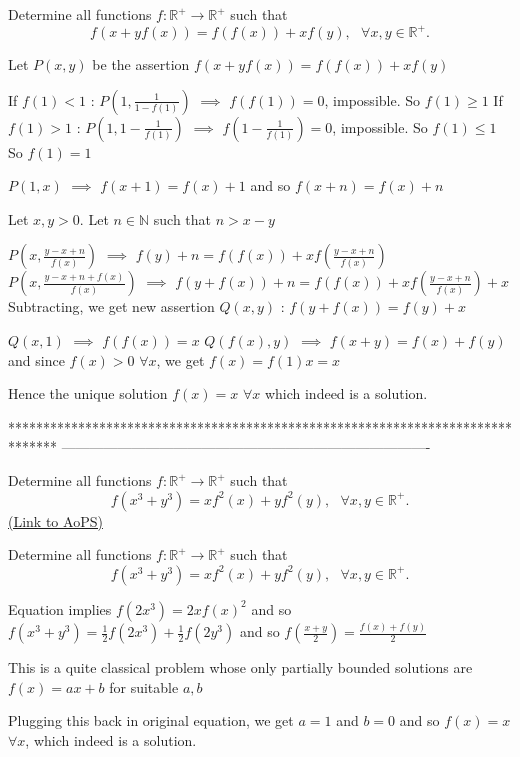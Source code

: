 \begin{solution}
	\begin{tcolorbox}Determine all functions $f : \mathbb{R}^+ \to \mathbb{R}^+$ such that \[   f(x+yf(x))=f(f(x))+xf(y)   , \ \ \  \forall x,y \in \mathbb{R}^+.\]\end{tcolorbox}
Let $P(x,y)$ be the assertion $f(x+yf(x))=f(f(x))+xf(y)$

If $f(1)<1$ : $P(1,\frac 1{1-f(1)})$ $\implies$ $f(f(1))=0$, impossible. So $f(1)\ge 1$
If $f(1)>1$ : $P(1,1-\frac 1{f(1)})$ $\implies$ $f(1-\frac 1{f(1)})=0$, impossible. So $f(1)\le 1$
So $f(1)=1$

$P(1,x)$ $\implies$ $f(x+1)=f(x)+1$ and so $f(x+n)=f(x)+n$

Let $x,y>0$. Let $n\in\mathbb N$ such that $n>x-y$

$P(x,\frac{y-x+n}{f(x)})$ $\implies$  $f(y)+n=f(f(x))+xf(\frac{y-x+n}{f(x)})$
$P(x,\frac{y-x+n+f(x)}{f(x)})$ $\implies$ $f(y+f(x))+n=f(f(x))+xf(\frac{y-x+n}{f(x)})+x$
Subtracting, we get new assertion $Q(x,y)$ : $f(y+f(x))=f(y)+x$

$Q(x,1)$ $\implies$ $f(f(x))=x$
$Q(f(x),y)$ $\implies$ $f(x+y)=f(x)+f(y)$ and since $f(x)>0$ $\forall x$, we get $f(x)=f(1)x=x$

Hence the unique solution $\boxed{f(x)=x}$ $\forall x$ which indeed is a solution.
\end{solution}
*******************************************************************************
-------------------------------------------------------------------------------

\begin{problem}
	Determine all functions $f : \mathbb{R}^+ \to \mathbb{R}^+$ such that \[ f(x^{3}+y^{3})=xf^{2}(x)+yf^{2}(y) , \ \ \  \forall x,y \in \mathbb{R}^+.\]
	\flushright \href{https://artofproblemsolving.com/community/c6h616142}{(Link to AoPS)}
\end{problem}



\begin{solution}
	\begin{tcolorbox}Determine all functions $f : \mathbb{R}^+ \to \mathbb{R}^+$ such that \[ f(x^{3}+y^{3})=xf^{2}(x)+yf^{2}(y) , \ \ \  \forall x,y \in \mathbb{R}^+.\]\end{tcolorbox}
Equation implies $f(2x^3)=2xf(x)^2$ and so $f(x^3+y^3)=\frac 12f(2x^3)+\frac 12f(2y^3)$ and so $f\left(\frac{x+y}2\right)=\frac{f(x)+f(y)}2$

This is a quite classical problem whose only partially bounded solutions are $f(x)=ax+b$ for suitable $a,b$

Plugging this back in original equation, we get $a=1$ and $b=0$ and so $\boxed{f(x)=x}$ $\forall x$, which indeed is a solution.
\end{solution}



